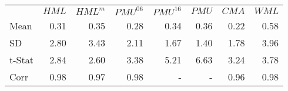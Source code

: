 \begin{table}[!ht]
\begin{tabular}{lrrrrrrr}
  \toprule
         & $HML$  & $HML^m$&$PMU^{06}$&$PMU^{16}$&$PMU$& $CMA$ & $WML$ \\
  Mean   &  0.31  &  0.35  &  0.28  &  0.34  &  0.36  &  0.22  &  0.58 \\
  SD     &  2.80  &  3.43  &  2.11  &  1.67  &  1.40  &  1.78  &  3.96 \\
  t-Stat &  2.84  &  2.60  &  3.38  &  5.21  &  6.63  &  3.24  &  3.78 \\
  Corr   &  0.98  &  0.97  &  0.98  &    -   &    -   &  0.96  &  0.98 \\
  \bottomrule
\end{tabular}
\label{tbl:replicated_factors}
\end{table}
